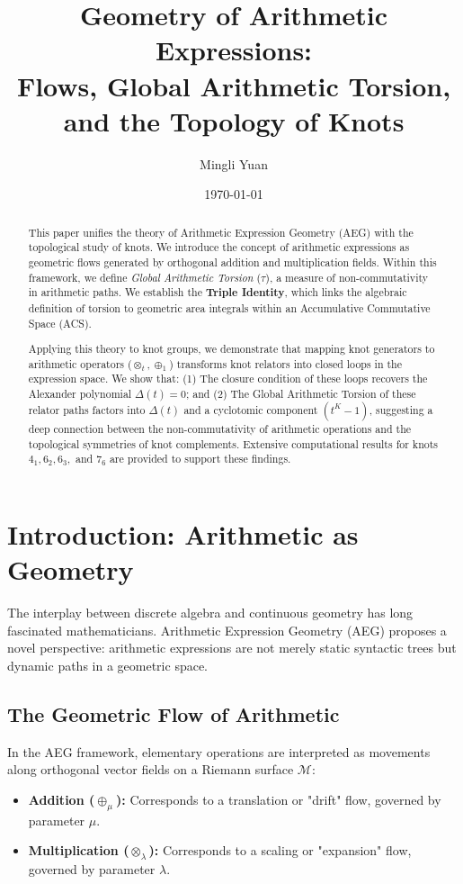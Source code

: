 \documentclass[a4paper,12pt]{article}
\title{\textbf{Geometry of Arithmetic Expressions:}\\
\large Flows, Global Arithmetic Torsion, and the Topology of Knots}
\author{Mingli Yuan}
\date{\today}
\begin{document}
\maketitle

\begin{abstract}
This paper unifies the theory of Arithmetic Expression Geometry (AEG) with the topological study of knots. We introduce the concept of arithmetic expressions as geometric flows generated by orthogonal addition and multiplication fields. Within this framework, we define \textit{Global Arithmetic Torsion} ($\tau$), a measure of non-commutativity in arithmetic paths. We establish the \textbf{Triple Identity}, which links the algebraic definition of torsion to geometric area integrals within an Accumulative Commutative Space (ACS).

Applying this theory to knot groups, we demonstrate that mapping knot generators to arithmetic operators ($\otimes_t, \oplus_1$) transforms knot relators into closed loops in the expression space. We show that: (1) The closure condition of these loops recovers the Alexander polynomial $\Delta(t)=0$; and (2) The Global Arithmetic Torsion of these relator paths factors into $\Delta(t)$ and a cyclotomic component $(t^K-1)$, suggesting a deep connection between the non-commutativity of arithmetic operations and the topological symmetries of knot complements. Extensive computational results for knots $4_1, 6_2, 6_3,$ and $7_6$ are provided to support these findings.
\end{abstract}

\tableofcontents
\newpage

\section{Introduction: Arithmetic as Geometry}

The interplay between discrete algebra and continuous geometry has long fascinated mathematicians. Arithmetic Expression Geometry (AEG) proposes a novel perspective: arithmetic expressions are not merely static syntactic trees but dynamic paths in a geometric space.

\subsection{The Geometric Flow of Arithmetic}
In the AEG framework, elementary operations are interpreted as movements along orthogonal vector fields on a Riemann surface $\mathcal{M}$:
\begin{itemize}
    \item \textbf{Addition ($\oplus_\mu$):} Corresponds to a translation or "drift" flow, governed by parameter $\mu$.
    \item \textbf{Multiplication ($\otimes_\lambda$):} Corresponds to a scaling or "expansion" flow, governed by parameter $\lambda$.
\end{itemize}
\end{document}
